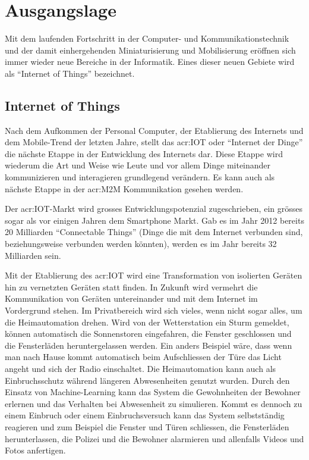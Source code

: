 \chapter{Ausgangslage}

Mit dem laufenden Fortschritt in der Computer- und Kommunikationstechnik und der damit einhergehenden Miniaturisierung und Mobilisierung eröffnen sich immer wieder neue Bereiche in der Informatik. Eines dieser neuen Gebiete wird als "`Internet of Things"' bezeichnet.


\section{Internet of Things}
Nach dem Aufkommen der Personal Computer, der Etablierung des Internets und dem Mobile-Trend der letzten Jahre, stellt das \gls{acr:IOT} oder "`Internet der Dinge"' die nächste Etappe in der Entwicklung des Internets dar. Diese Etappe wird wiederum die Art und Weise wie Leute und vor allem Dinge miteinander kommunizieren und interagieren grundlegend verändern. Es kann auch als nächste Etappe in der \gls{acr:M2M} Kommunikation gesehen werden.

Der \gls{acr:IOT}-Markt wird grosses Entwicklungspotenzial zugeschrieben, ein grösses sogar als vor einigen Jahren dem Smartphone Markt. Gab es im Jahr 2012 bereits 20 Milliarden "`Connectable Things"' (Dinge die mit dem Internet verbunden sind, beziehungsweise verbunden werden könnten), werden es im Jahr bereits 32 Milliarden sein. \cite[S. 5]{E:EMC:DigitalUniverseOfOpportunities}

Mit der Etablierung des \gls{acr:IOT} wird eine Transformation von isolierten Geräten hin zu vernetzten Geräten statt finden. In Zukunft wird vermehrt die Kommunikation von Geräten untereinander und mit dem Internet im Vordergrund stehen. Im Privatbereich wird sich vieles, wenn nicht sogar alles, um die Heimautomation drehen. Wird von der Wetterstation ein Sturm gemeldet, können automatisch die Sonnenstoren eingefahren, die Fenster geschlossen und die Fensterläden heruntergelassen werden. Ein anders Beispiel wäre, dass wenn man nach Hause kommt automatisch beim Aufschliessen der Türe das Licht angeht und sich der Radio einschaltet. Die Heimautomation kann auch als Einbruchsschutz während längeren Abwesenheiten genutzt wurden. Durch den Einsatz von Machine-Learning kann das System die Gewohnheiten der Bewohner erlernen und das Verhalten bei Abwesenheit zu simulieren. Kommt es dennoch zu einem Einbruch oder einem Einbruchsversuch kann das System selbstständig reagieren und zum Beispiel die Fenster und Türen schliessen, die Fensterläden herunterlassen, die Polizei und die Bewohner alarmieren und allenfalls Videos und Fotos anfertigen.

